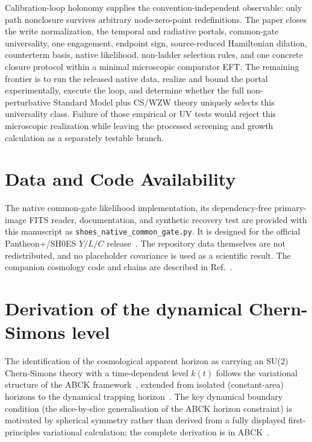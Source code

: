 \documentclass[aps,prd,twocolumn,10pt,superscriptaddress,nofootinbib]{revtex4-2}
\begin{document}
Calibration-loop holonomy supplies the convention-independent observable:
only path nonclosure survives arbitrary node-zero-point redefinitions.  The
paper closes the write normalization, the temporal and radiative portals,
common-gate universality, one engagement, endpoint sign, source-reduced
Hamiltonian dilation, counterterm basis, native likelihood, non-ladder
selection rules, and one concrete closure protocol within a minimal
microscopic comparator EFT.  The remaining frontier is to run the released
native data, realize and bound the portal experimentally, execute the loop,
and determine whether the full non-perturbative Standard Model plus CS/WZW
theory uniquely selects this universality class.  Failure of those empirical
or UV tests would reject this microscopic realization while leaving the
processed screening and growth calculation as a separately testable branch.


\section*{Data and Code Availability}
The native common-gate likelihood implementation, its dependency-free
primary-image FITS reader, documentation, and synthetic recovery test are
provided with this manuscript as
\texttt{shoes\_native\_common\_gate.py}.  It is designed for the official
Pantheon+/SH0ES $Y/L/C$ release~\cite{PantheonDataRelease}.  The repository
data themselves are not redistributed, and no placeholder covariance is
used as a scientific result.  The companion cosmology code and chains are
described in Ref.~\cite{Sayegh2026}.


\appendix


\section{Derivation of the dynamical Chern-Simons level}
\label{sec:dynamical_k_derivation}

The identification of the cosmological apparent horizon as
carrying an SU(2) Chern-Simons theory with a time-dependent level
$k(t)$ follows the variational structure of the ABCK
framework~\cite{Ashtekar1998,Ashtekar2000}, extended from isolated
(constant-area) horizons to the dynamical trapping
horizon~\cite{AshtekarKrishnan2003}.  The key dynamical boundary
condition (the slice-by-slice generalisation of the ABCK
horizon constraint) is motivated by spherical symmetry rather
than derived from a fully displayed first-principles variational
calculation; the complete derivation is in ABCK~\cite{Ashtekar1998}.
\end{document}
